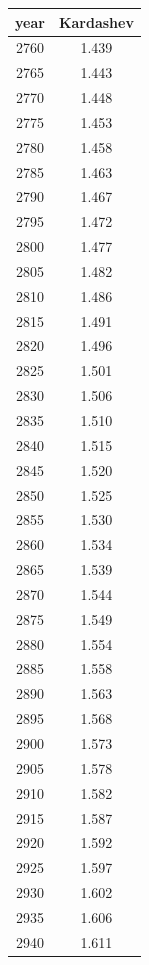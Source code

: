 \documentclass[a4paper]{article}
\begin{document}
	\begin{tabular}{|c|c|}
		\hline
		year & Kardashev \\
		\hline
		2760 & 1.439 \\
		\hline
		2765 & 1.443 \\
		\hline
		2770 & 1.448 \\
		\hline
		2775 & 1.453 \\
		\hline
		2780 & 1.458 \\
		\hline
		2785 & 1.463 \\
		\hline
		2790 & 1.467 \\
		\hline
		2795 & 1.472 \\
		\hline
		2800 & 1.477 \\
		\hline
		2805 & 1.482 \\
		\hline
		2810 & 1.486 \\
		\hline
		2815 & 1.491 \\
		\hline
		2820 & 1.496 \\
		\hline
		2825 & 1.501 \\
		\hline
		2830 & 1.506 \\
		\hline
		2835 & 1.510 \\
		\hline
		2840 & 1.515 \\
		\hline
		2845 & 1.520 \\
		\hline
		2850 & 1.525 \\
		\hline
		2855 & 1.530 \\
		\hline
		2860 & 1.534 \\
		\hline
		2865 & 1.539 \\
		\hline
		2870 & 1.544 \\
		\hline
		2875 & 1.549 \\
		\hline
		2880 & 1.554 \\
		\hline
		2885 & 1.558 \\
		\hline
		2890 & 1.563 \\
		\hline
		2895 & 1.568 \\
		\hline
		2900 & 1.573 \\
		\hline
		2905 & 1.578 \\
		\hline
		2910 & 1.582 \\
		\hline
		2915 & 1.587 \\
		\hline
		2920 & 1.592 \\
		\hline
		2925 & 1.597 \\
		\hline
		2930 & 1.602 \\
		\hline
		2935 & 1.606 \\
		\hline
		2940 & 1.611 \\

\end{tabular}
\end{document}
